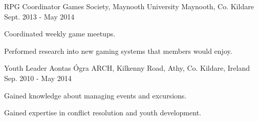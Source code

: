 \begin{cventries}
  \cventry
    {RPG Coordinator}
    {Games Society, Maynooth University}
    {Maynooth, Co. Kildare}
    {Sept. 2013 - May 2014}
    {
      \begin{cvitems}
        \item {Coordinated weekly game meetups.}
        \item {Performed research into new gaming systems that members would enjoy.}
      \end{cvitems}
    }
  \cventry
    {Youth Leader}
    {Aontas Ógra}
    {ARCH, Kilkenny Road, Athy, Co. Kildare, Ireland}
    {Sep. 2010 - May 2014}
    {
      \begin{cvitems}
        \item {Gained knowledge about managing events and excursions.}
        \item {Gained expertise in conflict resolution and youth development.}
      \end{cvitems}
    }
\end{cventries}
